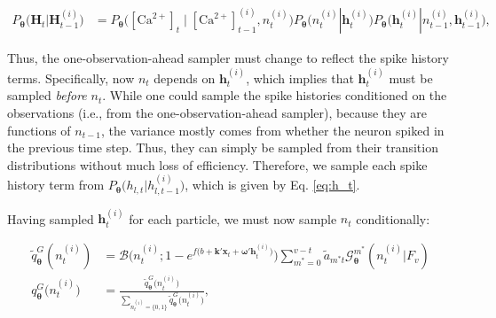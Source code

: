 \documentclass[10pt]{article}
\providecommand{\ve}[1]{\boldsymbol{#1}}
\providecommand{\ve}[1]{\boldsymbol{#1}}
\newcommand{\thetn}{\ve{\theta}}
\newcommand{\p}{P_{\thetn}}
\newcommand{\m}{m^{\ast}}
\newcommand{\Ca}{[\text{Ca}^{2+}]}
\begin{document}
\begin{align}
\p\big(\ve{H}_t | \ve{H}_{t-1}^{(i)}\big) &= \p\big(\Ca_t \mid \Ca_{t-1}^{(i)}, n_t^{(i)}\big) \p\big(n_t^{(i)} | \ve{h}_t^{(i)}\big) \p\big(\ve{h}_t^{(i)} | n_{t-1}^{(i)}, \ve{h}_{t-1}^{(i)}\big),
\end{align}

\noindent Thus, the one-observation-ahead sampler must change to reflect the spike history terms.  Specifically, now $n_t$ depends on $\ve{h}_t^{(i)}$, which implies that $\ve{h}_t^{(i)}$ must be sampled \emph{before} $n_t$.  While one could sample the spike histories conditioned on the observations (i.e., from the one-observation-ahead sampler), because they are functions of $n_{t-1}$, the variance mostly comes from whether the neuron spiked in the previous time step.  Thus, they can simply be sampled from their transition distributions without much loss of efficiency.  Therefore, we sample each spike history term from $\p\big(h_{l,t} | h_{l,t-1}^{(i)}\big)$, which is given by Eq. \ref{eq:h_t}.

Having sampled $\ve{h}_t^{(i)}$ for each particle, we must now sample $n_t$ conditionally:

%
%
\begin{subequations} \label{aeq:qn1}
\begin{align}
\widetilde{q}_{\thetn}^G(n_t^{(i)})&=\mathcal{B}\bigg(n_t^{(i)}; 1-e^{f\big(b+\ve{k}'\ve{x}_t+\ve{\omega}'\ve{h}_t^{(i)}\big)}\bigg) \sum_{\m=0}^{v-t} \widetilde{a}_{\m t} \mathcal{G}_{\thetn}^{\m}(n_t^{(i)}| F_v)\\
q_{\thetn}^{G}\big(n_t^{(i)}\big)&=\frac{\widetilde{q}_{\thetn}^G\big(n_t^{(i)}\big)}{\sum_{n_t^{(i)}=\{0,1\}} \widetilde{q}_{\thetn}^G\big(n_t^{(i)}\big)},
\end{align}
\end{subequations}
\end{document}
